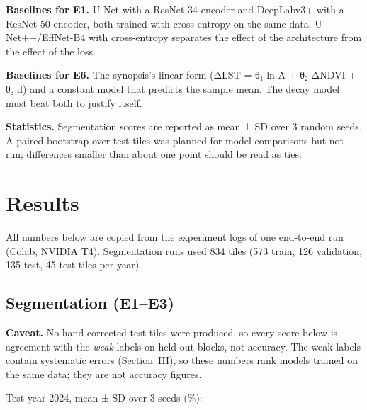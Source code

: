 \documentclass[conference]{IEEEtran}
\begin{document}
\textbf{Baselines for E1.} U-Net with a ResNet-34 encoder and DeepLabv3+
with a ResNet-50 encoder, both trained with cross-entropy on the same
data. U-Net++/EffNet-B4 with cross-entropy separates the effect of the
architecture from the effect of the loss.

\textbf{Baselines for E6.} The synopsis's linear form (ΔLST = θ₁ ln A +
θ₂ ΔNDVI + θ₃ d) and a constant model that predicts the sample mean. The
decay model must beat both to justify itself.

\textbf{Statistics.} Segmentation scores are reported as mean ± SD over
3 random seeds. A paired bootstrap over test tiles was planned for model
comparisons but not run; differences smaller than about one point should
be read as ties.

\section{Results}\label{results}

All numbers below are copied from the experiment logs of one end-to-end
run (Colab, NVIDIA T4). Segmentation runs used 834 tiles (573 train, 126
validation, 135 test, 45 test tiles per year).

\subsection{Segmentation (E1--E3)}\label{segmentation-e1e3}

\textbf{Caveat.} No hand-corrected test tiles were produced, so every
score below is agreement with the \emph{weak} labels on held-out blocks,
not accuracy. The weak labels contain systematic errors (Section~III),
so these numbers rank models trained on the same data; they are not
accuracy figures.

Test year 2024, mean ± SD over 3 seeds (\%):
\end{document}
